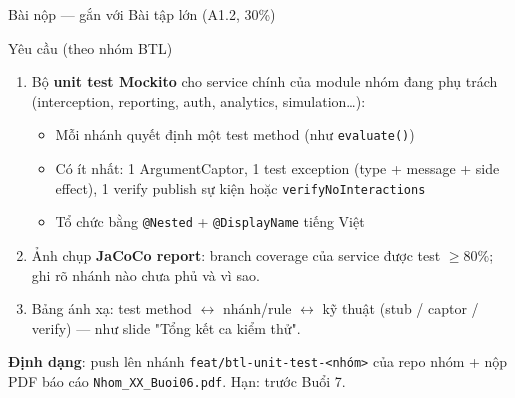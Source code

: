 \documentclass[aspectratio=169,12pt]{beamer}
\begin{document}
\begin{frame}{Bài nộp --- gắn với Bài tập lớn (A1.2, 30\%)}
  \begin{block}{Yêu cầu (theo nhóm BTL)}
    \begin{enumerate}
      \item Bộ \textbf{unit test Mockito} cho service chính của module nhóm
        đang phụ trách (interception, reporting, auth, analytics,
        simulation\ldots):
        \begin{itemize}\small
          \item Mỗi nhánh quyết định một test method (như \texttt{evaluate()})
          \item Có ít nhất: 1 ArgumentCaptor, 1 test exception
            (type + message + side effect), 1 verify publish sự kiện
            hoặc \texttt{verifyNoInteractions}
          \item Tổ chức bằng \texttt{@Nested} + \texttt{@DisplayName} tiếng Việt
        \end{itemize}
      \item Ảnh chụp \textbf{JaCoCo report}: branch coverage của service
        được test $\geq 80\%$; ghi rõ nhánh nào chưa phủ và vì sao.
      \item Bảng ánh xạ: test method $\leftrightarrow$ nhánh/rule
        $\leftrightarrow$ kỹ thuật (stub / captor / verify) --- như slide
        "Tổng kết ca kiểm thử".
    \end{enumerate}
  \end{block}

  {\small \textbf{Định dạng}: push lên nhánh \texttt{feat/btl-unit-test-<nhóm>}
  của repo nhóm + nộp PDF báo cáo \texttt{Nhom\_XX\_Buoi06.pdf}.
  Hạn: trước Buổi 7.}
\end{frame}
\end{document}
